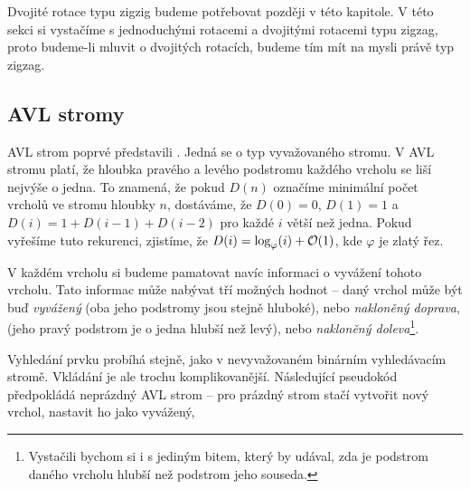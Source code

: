 Dvojité rotace typu zigzig budeme potřebovat později v této kapitole. V této
sekci si vystačíme s jednoduchými rotacemi a dvojitými rotacemi typu zigzag,
proto budeme-li mluvit o dvojitých rotacích, budeme tím mít na mysli právě typ
zigzag.

\subsection{AVL stromy}

AVL strom poprvé představili \citet{AVL}. Jedná se o typ vyvažovaného stromu. V
AVL stromu platí, že hloubka pravého a levého podstromu každého vrcholu se liší
nejvýše o jedna. To znamená, že pokud $D(n)$ označíme minimální počet vrcholů
ve stromu hloubky $n$, dostáváme, že $D(0)=0$, $D(1)=1$ a
$D(i)=1+D(i-1)+D(i-2)$ pro každé $i$ větší než jedna. Pokud vyřešíme tuto
rekurenci, zjistíme, že $D(i)=\log_\varphi(i) + \mathcal O(1)$, kde $\varphi$ je zlatý
řez.

V každém vrcholu si budeme pamatovat navíc informaci o vyvážení tohoto vrcholu.
Tato informac může nabývat tří možných hodnot -- daný vrchol může být buď
\emph{vyvážený} (oba jeho podstromy jsou stejně hluboké), nebo \emph{nakloněný
doprava}, (jeho pravý podstrom je o jedna hlubší než levý), nebo
\emph{nakloněný doleva}\footnote{Vystačili bychom si i s jediným bitem, který by udával, zda je podstrom daného vrcholu hlubší než podstrom jeho souseda.}.

Vyhledání prvku probíhá stejně, jako v nevyvažovaném binárním vyhledávacím stromě. 
Vkládání je ale trochu komplikovanější. Následující pseudokód předpokládá neprázdný
AVL strom -- pro prázdný strom stačí vytvořit nový vrchol, nastavit ho jako vyvážený,






